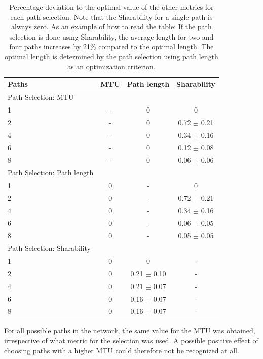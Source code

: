 \begin{table}
	\begin{center}
		\begin{tabular}{lccc}\toprule
			   			Paths & MTU & Path length & Sharability \\\midrule
			
			{\footnotesize Path Selection: }MTU			& & & \\
			1  	& - & 0 & 0    \\
			2  	& - & 0 & 0.72 {\small $\pm$ 0.21}  \\
			4  	& - & 0 & 0.34 {\small $\pm$ 0.16} \\
			6  	& - & 0 & 0.12 {\small $\pm$ 0.08} \\
			8  	& - & 0 & 0.06 {\small $\pm$ 0.06} \smallskip\\
			{\footnotesize Path Selection: }Path length  	& & & \\
			1  	& 0 & - & 0    \\
			2  	& 0 & - & 0.72 {\small $\pm$ 0.21} \\
			4  	& 0 & - & 0.34 {\small $\pm$ 0.16} \\
			6  	& 0 & - & 0.06 {\small $\pm$ 0.05} \\
			8 		& 0 & - & 0.05 {\small $\pm$ 0.05} \smallskip\\
			{\footnotesize Path Selection: }Sharability		& & & \\
			1  	& 0 & 0    & - \\
			2 	& 0 & 0.21 {\small $\pm$ 0.10}  & - \\
			4  	& 0 & 0.21 {\small $\pm$ 0.07} & - \\
			6  	& 0 & 0.16 {\small $\pm$ 0.07} & - \\
			8  	& 0 & 0.16 {\small $\pm$  0.07} & - \\\bottomrule
		\end{tabular}
		\caption{Percentage deviation to the optimal value of the other metrics for each path selection. Note that the Sharability for a single path is always zero. As an example of how to read the table: If the path selection is done using Sharability, the average length for two and four paths increases by 21\% compared to the optimal length. The optimal length is determined by the path selection using path length as an optimization criterion.}
		\label{tab:DiffFromOptimal}
	\end{center}
\end{table}

For all possible paths in the network, the same value for the MTU was obtained, irrespective of what metric for the selection was used. A possible positive effect of choosing paths with a higher MTU could therefore not be recognized at all. 

